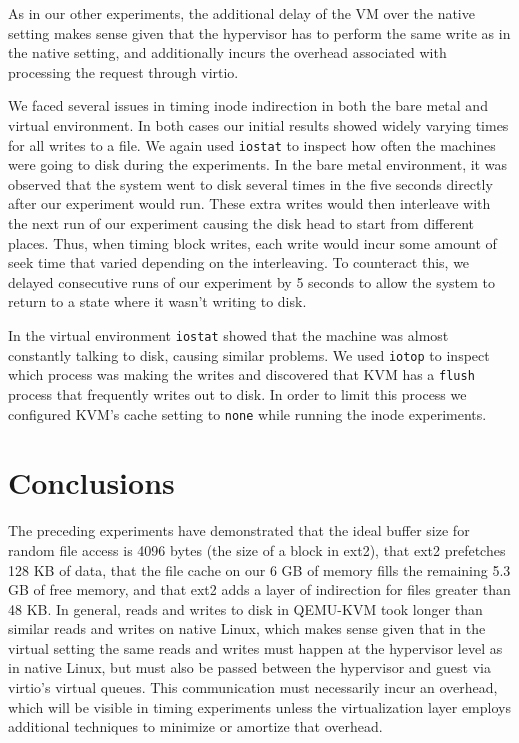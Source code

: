 \documentclass[letterpaper,twocolumn,10pt]{article}
\begin{document}
As in our other experiments, the additional delay of the VM over the native setting makes sense given that the hypervisor has to perform the same write as in the native setting, and additionally incurs the overhead associated with processing the request through virtio.

We faced several issues in timing inode indirection in both the bare metal and virtual environment.
In both cases our initial results showed widely varying times for all writes to a file.
We again used \texttt{iostat} to inspect how often the machines were going to disk during the experiments.
In the bare metal environment, it was observed that the system went to disk several times in the five seconds directly after our experiment would run.
These extra writes would then interleave with the next run of our experiment causing the disk head to start from different places.
Thus, when timing block writes, each write would incur some amount of seek time that varied depending on the interleaving.
To counteract this, we delayed consecutive runs of our experiment by 5 seconds to allow the system to return to a state where it wasn't writing to disk.

In the virtual environment \texttt{iostat} showed that the machine was almost constantly talking to disk, causing similar problems.
We used \texttt{iotop} to inspect which process was making the writes and discovered that KVM has a \texttt{flush} process that frequently writes out to disk.
In order to limit this process we configured KVM's cache setting to \texttt{none} while running the inode experiments.

\section{Conclusions}
The preceding experiments have demonstrated that the ideal buffer size for random file access is 4096 bytes (the size of a block in ext2), that ext2 prefetches 128 KB of data, that the file cache on our 6 GB of memory fills the remaining 5.3 GB of free memory, and that ext2 adds a layer of indirection for files greater than 48 KB. 
In general, reads and writes to disk in QEMU-KVM took longer than similar reads and writes on native Linux, which makes sense given that in the virtual setting the same reads and writes must happen at the hypervisor level as in native Linux, but must also be passed between the hypervisor and guest via virtio's virtual queues. 
This communication must necessarily incur an overhead, which will be visible in timing experiments unless the virtualization layer employs additional techniques to minimize or amortize that overhead. 
\end{document}
